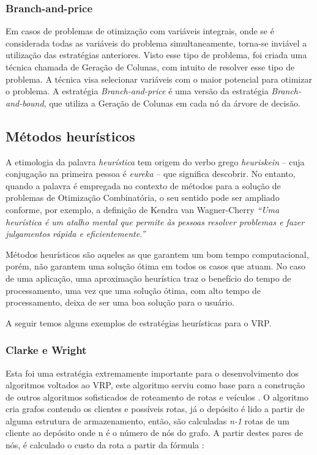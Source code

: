 \subsubsection{Branch-and-price}
Em casos de problemas de otimização com variáveis integrais, onde se é considerada todas as variáveis do problema simultaneamente, torna-se inviável a utilização das estratégias anteriores. Visto esse tipo de problema, foi criada uma técnica chamada de Geração de Colunas, com intuito de resolver esse tipo de problema. A técnica visa selecionar variáveis com o maior potencial para otimizar o problema. A estratégia \emph{Branch-and-price} é uma versão da estratégia \emph{Branch-and-bound}, que utiliza a Geração de Colunas  em cada nó da árvore de decisão.

\subsection{Métodos heurísticos}\label{heuristica}
A etimologia da palavra \emph{heurística} tem origem do verbo grego \emph{heuriskein} -- cuja conjugação na primeira pessoa é \emph{eureka} -- que significa descobrir. No entanto, quando a palavra é empregada no contexto de métodos para a solução de problemas de Otimização Combinatória, o seu sentido pode ser ampliado conforme, por exemplo, a definição de Kendra van Wagner-Cherry \emph{``Uma heurística é um atalho mental que permite às pessoas resolver problemas e fazer julgamentos rápida e eficientemente.''} \cite{goldbarg}


Métodos heurísticos são aqueles as que garantem um bom tempo computacional, porém, não garantem uma solução ótima em todos os casos que atuam. No caso de uma aplicação, uma aproximação heurística traz o benefício do tempo de processamento, uma vez que uma solução ótima, com alto tempo de processamento, deixa de ser uma boa solução para o usuário. 

A seguir temos alguns exemplos de estratégias heurísticas para o VRP.

\subsubsection{Clarke e Wright}

Esta foi uma estratégia extremamente importante para o desenvolvimento dos algoritmos voltados ao VRP, este algoritmo serviu como base para a construção de outros algoritmos sofisticados de roteamento de rotas e veículos \cite{milton-nascimento}. O algoritmo cria grafos contendo os clientes e possíveis rotas, já o depósito é lido a partir de alguma estrutura de armazenamento, então, são calculadas \emph{n-1} rotas de um cliente ao depósito onde n é o número de nós do grafo. A partir destes pares de nós, é calculado  o custo da rota a partir da fórmula \cite[p. 32]{maxwell}: 

